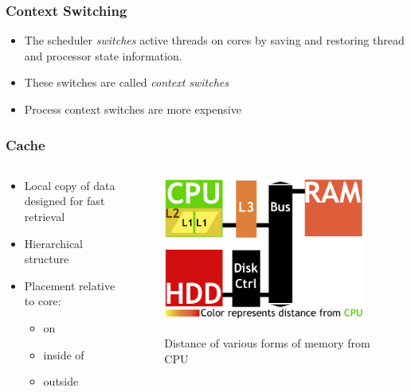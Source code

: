 \documentclass{beamer}
\newcommand{\linespace}{\vskip 0.25cm}
\begin{document}
\begin{frame}
\frametitle{Context Switching}
\begin{itemize}
\item The scheduler \emph{switches} active threads on cores by saving and restoring thread and processor state information.
\item These switches are called \emph{context switches}
\linespace
\item Process context switches are more expensive
\end{itemize}
\end{frame}

\begin{frame}
\frametitle{Cache}

\begin{columns}
\begin{column}{0.5\textwidth}
\begin{itemize}
	\item Local copy of data designed for fast retrieval
	\item Hierarchical structure %
	\linespace
	\item Placement relative to core:
	\begin{itemize}
		\item on
		\item inside of
		\item outside

	\end{itemize}
\end{itemize}

\end{column}
\begin{column}{0.5\textwidth}
		\begin{figure}
		\includegraphics[width=0.95\textwidth]{Illustrations/CacheAbstract}
		\label{fig:domains}
		\caption{Distance of various forms of memory from CPU}
		\end{figure}
	\end{column}
\end{columns}
\end{frame}
\end{document}

